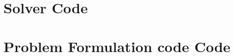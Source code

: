 \documentclass[MTech]{iitmdiss}
\begin{document}
\section{Solver Code}

\pagebreak
\section{Problem Formulation code Code}

\pagebreak

\pagebreak

\pagebreak

\pagebreak

\pagebreak

\pagebreak

\pagebreak
%  	
%	

\begin{thebibliography}{9}


\end{thebibliography}
\end{document}
